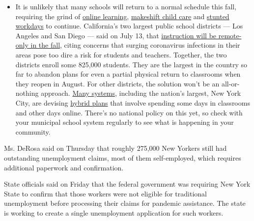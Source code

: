 \begin{itemize}
  \begin{itemize}
  \tightlist
  \item
    It is unlikely that many schools will return to a normal schedule
    this fall, requiring the grind of
    \href{https://www.nytimes.com/2020/06/05/us/coronavirus-education-lost-learning.html?action=click\&pgtype=Article\&state=default\&region=MAIN_CONTENT_3\&context=storylines_faq}{online
    learning},
    \href{https://www.nytimes.com/2020/05/29/us/coronavirus-child-care-centers.html?action=click\&pgtype=Article\&state=default\&region=MAIN_CONTENT_3\&context=storylines_faq}{makeshift
    child care} and
    \href{https://www.nytimes.com/2020/06/03/business/economy/coronavirus-working-women.html?action=click\&pgtype=Article\&state=default\&region=MAIN_CONTENT_3\&context=storylines_faq}{stunted
    workdays} to continue. California's two largest public school
    districts --- Los Angeles and San Diego --- said on July 13, that
    \href{https://www.nytimes.com/2020/07/13/us/lausd-san-diego-school-reopening.html?action=click\&pgtype=Article\&state=default\&region=MAIN_CONTENT_3\&context=storylines_faq}{instruction
    will be remote-only in the fall}, citing concerns that surging
    coronavirus infections in their areas pose too dire a risk for
    students and teachers. Together, the two districts enroll some
    825,000 students. They are the largest in the country so far to
    abandon plans for even a partial physical return to classrooms when
    they reopen in August. For other districts, the solution won't be an
    all-or-nothing approach.
    \href{https://bioethics.jhu.edu/research-and-outreach/projects/eschool-initiative/school-policy-tracker/}{Many
    systems}, including the nation's largest, New York City, are
    devising
    \href{https://www.nytimes.com/2020/06/26/us/coronavirus-schools-reopen-fall.html?action=click\&pgtype=Article\&state=default\&region=MAIN_CONTENT_3\&context=storylines_faq}{hybrid
    plans} that involve spending some days in classrooms and other days
    online. There's no national policy on this yet, so check with your
    municipal school system regularly to see what is happening in your
    community.
  \end{itemize}
\end{itemize}

Ms. DeRosa said on Thursday that roughly 275,000 New Yorkers still had
outstanding unemployment claims, most of them self-employed, which
requires additional paperwork and confirmation.

State officials said on Friday that the federal government was requiring
New York State to confirm that those workers were not eligible for
traditional unemployment before processing their claims for pandemic
assistance. The state is working to create a single unemployment
application for such workers.

